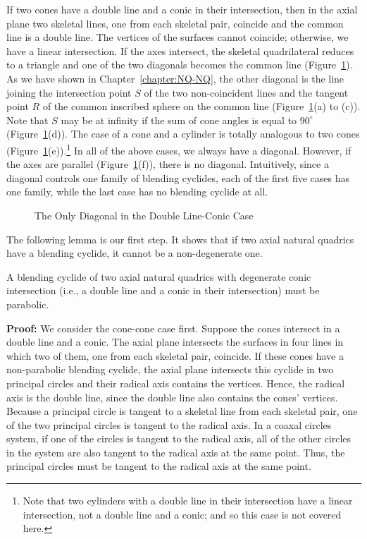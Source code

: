      If two cones have a double line and a conic in their intersection, then
in the axial plane two skeletal lines, one from each skeletal pair, coincide 
and the common line is a double line.  The vertices of the surfaces cannot 
coincide; otherwise, we have a linear intersection.  If the axes intersect,
the skeletal quadrilateral reduces to a triangle and one of the two 
diagonals becomes the common line (Figure~\ref{fig:three-lines}).
As we have shown in Chapter~\ref{chapter:NQ-NQ}, the other diagonal is the 
line joining the intersection point $S$ of the two non-coincident lines and 
the tangent point $R$ of the common inscribed sphere on the common line
(Figure~\ref{fig:three-lines}(a) to (c)).  Note that $S$ may be at infinity if
the sum of cone angles is equal to $90^\circ$ 
(Figure~\ref{fig:three-lines}(d)).  The case of a cone and a cylinder is 
totally analogous to two cones 
(Figure~\ref{fig:three-lines}(e)).\footnote{Note that two cylinders
with a double line in their intersection have a linear intersection, not a
double line and a conic; and so this case is not covered here.}  
In all of the above cases, we always have a diagonal.
However, if the axes are parallel (Figure~\ref{fig:three-lines}(f)),
there is no diagonal.  Intuitively, since a diagonal controls one family of 
blending cyclides, each of the first five cases has one family, while
the last case has no blending cyclide at all.  
\begin{figure}
\vspace{7.5cm}
\caption{The Only Diagonal in the Double Line-Conic Case}
\label{fig:three-lines}
\end{figure}

     The following lemma is our first step.  It shows that if two axial natural
quadrics have a blending cyclide, it cannot be a non-degenerate one.

\begin{lemma}
\label{lemma:only-one-family}
     A blending cyclide of two axial natural quadrics with degenerate conic
intersection (i.e., a double line and a conic in their intersection) must be
parabolic.
\end{lemma}
{\bf Proof:} We consider the cone-cone case first.  Suppose the cones 
intersect in a double line and a conic.  The axial plane intersects the 
surfaces in four lines in which two of them, one from each skeletal pair, 
coincide.  If these cones have a non-parabolic blending cyclide, the axial 
plane intersects this cyclide in two principal circles and their radical axis 
contains the vertices.  Hence, the radical axis is the double line, since the 
double line also contains the cones' vertices.  Because a principal circle is 
tangent to a skeletal line from each skeletal pair, one of the two principal 
circles is tangent to the radical axis.  In a coaxal circles system, if one of 
the circles is tangent to the radical axis, all of the other circles in the 
system are also tangent to the radical axis at the same point.  Thus, the 
principal circles must be tangent to the radical axis at the same point.

